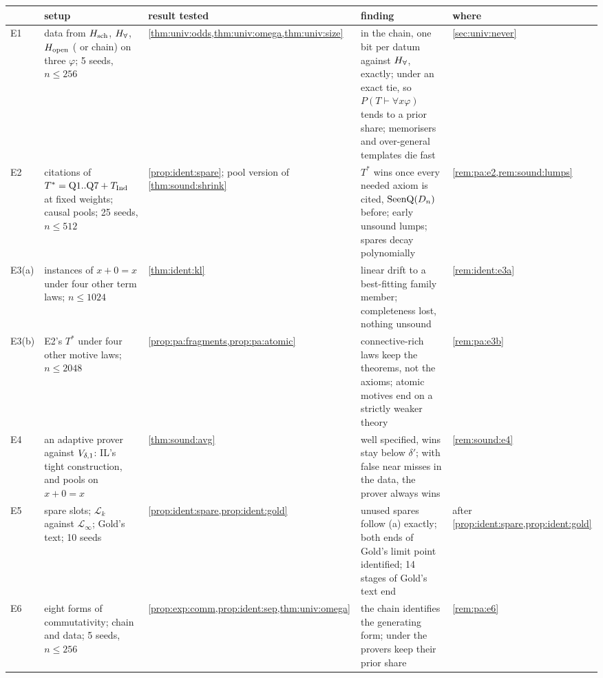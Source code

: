 \begin{table}[!t]\centering\footnotesize\crefabbrev
\begin{tabularx}{\textwidth}{@{}l>{\raggedright\arraybackslash}p{}>{\raggedright\arraybackslash}p{}>{\raggedright\arraybackslash}X>{\raggedright\arraybackslash}p{}@{}}
\toprule
& setup & result tested & finding & where\\
\midrule
E1 & data from $H_{\mathrm{sch}}$, $H_{\forall}$, $H_{\mathrm{open}}$ (\Lzero{} or chain) on three $\varphi$; 5 seeds, $n\le256$ & \cref{thm:univ:odds,thm:univ:omega,thm:univ:size} & in the chain, one bit per datum against $H_{\forall}$, exactly; under \Lselc{} an exact tie, so $P(T\vdash\forall x\varphi)$ tends to a prior share; memorisers and over-general templates die fast & \cref{sec:univ:never}\\
E2 & \Lzero{} citations of $T^*=\mathrm{Q1..Q7}+T_{\mathrm{Ind}}$ at fixed weights; causal pools; 25 seeds, $n\le512$ & \cref{prop:ident:spare}; pool version of \cref{thm:sound:shrink} & $T^*$ wins once every needed axiom is cited, $\mathrm{SeenQ}(D_n)$ before; early unsound lumps; spares decay polynomially & \cref{rem:pa:e2,rem:sound:lumps}\\
E3(a) & instances of $x+0=x$ under four other term laws; $n\le1024$ & \cref{thm:ident:kl} & linear drift to a best-fitting family member; completeness lost, nothing unsound & \cref{rem:ident:e3a}\\
E3(b) & E2's $T^*$ under four other motive laws; $n\le2048$ & \cref{prop:pa:fragments,prop:pa:atomic} & connective-rich laws keep the theorems, not the axioms; atomic motives end on a strictly weaker theory & \cref{rem:pa:e3b}\\
E4 & an adaptive prover against $V_{\delta,1}$: IL's tight construction, and pools on $x+0=x$ & \cref{thm:sound:avg} & well specified, wins stay below $\delta'$; with false near misses in the data, the prover always wins & \cref{rem:sound:e4}\\
E5 & spare slots; $\mathcal L_k$ against $\mathcal L_\infty$; Gold's text; 10 seeds & \cref{prop:ident:spare,prop:ident:gold} & unused spares follow (a) exactly; both ends of Gold's limit point identified; 14 stages of Gold's text end & after \cref{prop:ident:spare,prop:ident:gold}\\
E6 & eight forms of commutativity; chain and \Lzero{} data; 5 seeds, $n\le256$ & \cref{prop:exp:comm,prop:ident:sep,thm:univ:omega} & the chain identifies the generating form; under \Lselc{} the provers keep their prior share & \cref{rem:pa:e6}\\

\end{tabularx}
\end{table}

